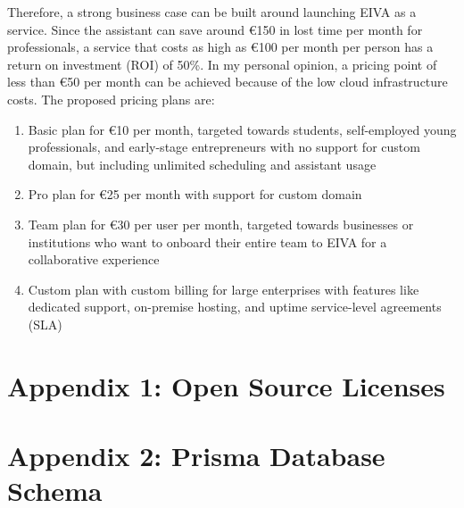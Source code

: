 \documentclass{article}
\begin{document}
Therefore, a strong business case can be built around launching EIVA as a service. Since the assistant can save around €150 in lost time per month for professionals, a service that costs as high as €100 per month per person has a return on investment (ROI) of 50\%. In my personal opinion, a pricing point of less than €50 per month can be achieved because of the low cloud infrastructure costs. The proposed pricing plans are:

\begin{enumerate}
	\item Basic plan for €10 per month, targeted towards students, self-employed young professionals, and early-stage entrepreneurs with no support for custom domain, but including unlimited scheduling and assistant usage
	\item Pro plan for €25 per month with support for custom domain
	\item Team plan for €30 per user per month, targeted towards businesses or institutions who want to onboard their entire team to EIVA for a collaborative experience
	\item Custom plan with custom billing for large enterprises with features like dedicated support, on-premise hosting, and uptime service-level agreements (SLA)
\end{enumerate}

\newpage

\section*{Appendix 1: Open Source Licenses}

\newpage

\section*{Appendix 2: Prisma Database Schema}

\newpage



\end{document}
